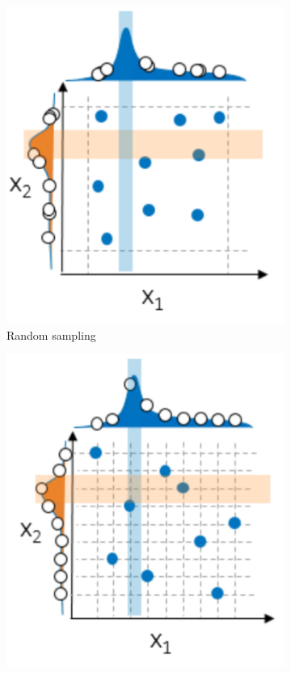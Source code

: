 \begin{figure}[!ht]
  \centering
    \begin{subfigure}[t]{.35\textwidth}
        \centering
        \includegraphics[width=\textwidth]{figures/chp4/random_sampling.png}
        \caption{Random sampling}
    \end{subfigure}
    \begin{subfigure}[t]{.35\textwidth}
        \centering
        \includegraphics[width=\textwidth]{figures/chp4/latin_hypercube_sampling.png}

\end{subfigure}
\end{figure}
